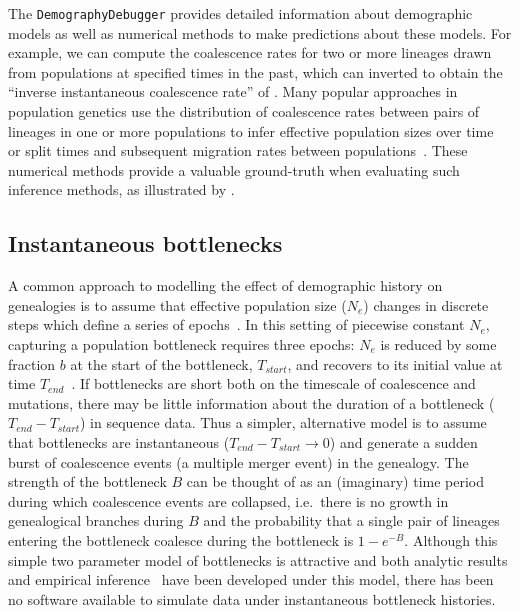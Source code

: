 \documentclass{article}
\begin{document}
The \texttt{DemographyDebugger} provides detailed information about
demographic models as well as numerical methods to make predictions
about these models. For example, we can compute
the coalescence rates for two or more lineages
drawn from populations at specified times in the past,
which can inverted to obtain the
``inverse instantaneous coalescence rate'' of \citet{chikhi2018iicr}.
Many popular approaches in population genetics use the distribution of
coalescence rates between pairs of lineages in one or more populations to infer
effective population sizes over
time~\citep{li2011inference,sheehan2013estimating,schiffels2014inferring} or
split times and subsequent migration rates between
populations~\citep{wang2020tracking}.
These numerical methods provide a valuable
ground-truth when evaluating such inference methods, as illustrated by
\cite{adrion2020community}.

\subsection*{Instantaneous bottlenecks}

A common approach to modelling the effect of demographic history on genealogies
is to assume that effective population size ($N_e$) changes in discrete steps
which define a series of epochs~\citep{griffiths1994sampling, marth2004allele,
keightley2007joint,li2011inference}. In this setting of piecewise constant
$N_e$, capturing a population bottleneck requires three epochs: $N_e$ is
reduced by some fraction $b$ at the start of the bottleneck, $T_{start}$, and
recovers to its initial value at time $T_{end}$~\citep{marth2004allele}. If
bottlenecks are short both on the timescale of coalescence and mutations,
there may be little information about the duration of a bottleneck
($T_{end}-T_{start}$) in sequence data. Thus a simpler, alternative model is to
assume that bottlenecks are instantaneous ($T_{end}-T_{start} \rightarrow 0$)
and generate a sudden burst of coalescence events (a multiple merger event) in
the genealogy. The strength of the bottleneck $B$ can be thought of as an
(imaginary) time period during which coalescence events are collapsed,
i.e.\ there is no growth in genealogical branches during $B$ and the probability that a
single pair of lineages entering the bottleneck coalesce during the bottleneck
is $1-e^{-B}$. Although this simple two parameter model of bottlenecks is
attractive and both analytic results and empirical
inference~\citep{griffiths1994sampling, galtier2000detecting,
bunnefeld2015inferring} have been developed under this model, there has
been no software available to simulate data under instantaneous
bottleneck histories.
\end{document}
